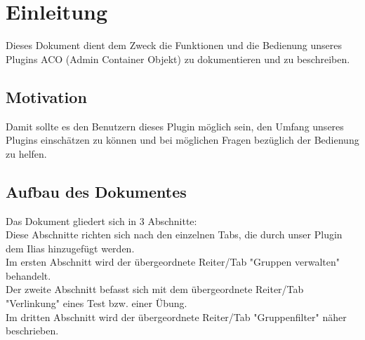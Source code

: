 \chapter{Einleitung}
Dieses Dokument dient dem Zweck die Funktionen und die Bedienung unseres Plugins ACO (Admin Container Objekt) zu dokumentieren und zu beschreiben.  

\section*{Motivation}
Damit sollte es den Benutzern dieses Plugin möglich sein, den Umfang unseres Plugins einschätzen zu können und bei möglichen Fragen bezüglich der Bedienung zu helfen.  

\section*{Aufbau des Dokumentes}
Das Dokument gliedert sich in 3 Abschnitte:\\
Diese Abschnitte richten sich nach den einzelnen Tabs, die durch unser Plugin dem Ilias hinzugefügt werden.\\
Im ersten Abschnitt wird der übergeordnete Reiter/Tab "Gruppen verwalten" behandelt.\\
Der zweite Abschnitt befasst sich mit dem übergeordnete Reiter/Tab "Verlinkung" eines Test bzw. einer Übung.\\
Im dritten Abschnitt wird der übergeordnete Reiter/Tab "Gruppenfilter" näher beschrieben. 